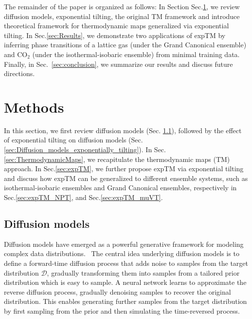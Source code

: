 \documentclass[aip,jcp,reprint,longbibliography]{revtex4-1}
\begin{document}
The remainder of the paper is organized as follows: In Section Sec.\ref{sec:Methods}, we review diffusion models, exponential tilting, the original TM framework and introduce theoretical framework for thermodynamic maps generalized via exponential tilting. In Sec.\ref{sec:Results}, we demonstrate two applications of expTM by inferring phase transitions of a lattice gas (under the Grand Canonical ensemble) and CO$_2$ (under the isothermal-isobaric ensemble) from minimal training data. Finally, in Sec.~\ref{sec:conclusion}, we summarize our results and discuss future directions.



 
\section{Methods}
\label{sec:Methods}

In this section, we first review diffusion models (Sec. \ref{sec:diffusion_models}), followed by the effect of exponential tilting on diffusion models (Sec.\ref{sec:Diffusion_models_exponentially_tilting}). In Sec. \ref{sec:ThermodynamicMaps}, we recapitulate the thermodynamic maps (TM) approach. In Sec.\ref{sec:expTM}, we further propose expTM via exponential tilting and discuss how expTM can be generalized to different ensemble systems, such as isothermal-isobaric ensembles and Grand Canonical ensembles, respectively in Sec.\ref{sec:expTM_NPT}, and Sec.\ref{sec:expTM_muVT}.


\subsection{Diffusion models}
\label{sec:diffusion_models}

Diffusion models have emerged as a powerful generative framework for modeling complex data distributions.~\cite{dickstein2015deep,song2019generative,ho2020denoising,song2021scorebased} The central idea underlying diffusion models is to define a forward-time diffusion process that adds noise to samples from the target distribution $\mathcal{D}$, gradually transforming them into samples from a tailored prior distribution which is easy to sample. A neural network learns to approximate the reverse diffusion process, gradually denoising samples to recover the original distribution. This enables generating further samples from the target distribution by first sampling from the prior and then simulating the time-reversed process. 
\end{document}
